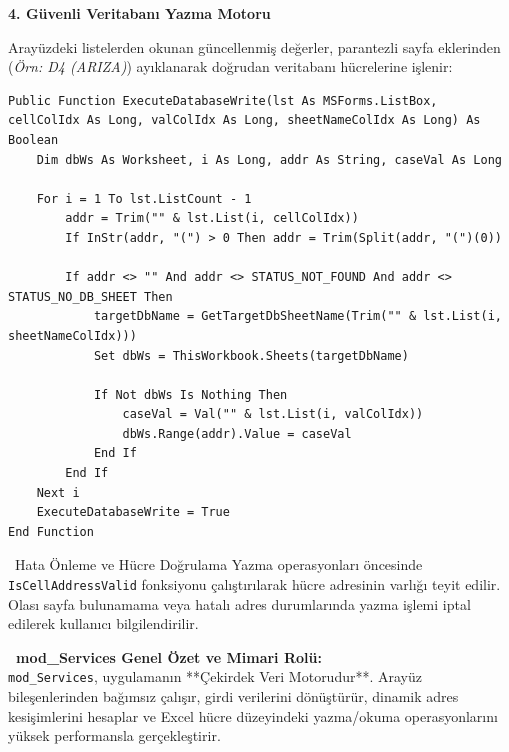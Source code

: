 \vspace{0.3cm}

\textbf{\textcolor{primary}{4. Güvenli Veritabanı Yazma Motoru}}

Arayüzdeki listelerden okunan güncellenmiş değerler, parantezli sayfa eklerinden (\textit{Örn: D4 (ARIZA)}) ayıklanarak doğrudan veritabanı hücrelerine işlenir:

\begin{lstlisting}[caption={Veritabanı Hücre Yazma Operasyonu}]
Public Function ExecuteDatabaseWrite(lst As MSForms.ListBox, cellColIdx As Long, valColIdx As Long, sheetNameColIdx As Long) As Boolean
    Dim dbWs As Worksheet, i As Long, addr As String, caseVal As Long
    
    For i = 1 To lst.ListCount - 1
        addr = Trim("" & lst.List(i, cellColIdx))
        If InStr(addr, "(") > 0 Then addr = Trim(Split(addr, "(")(0))
        
        If addr <> "" And addr <> STATUS_NOT_FOUND And addr <> STATUS_NO_DB_SHEET Then
            targetDbName = GetTargetDbSheetName(Trim("" & lst.List(i, sheetNameColIdx)))
            Set dbWs = ThisWorkbook.Sheets(targetDbName)
            
            If Not dbWs Is Nothing Then
                caseVal = Val("" & lst.List(i, valColIdx))
                dbWs.Range(addr).Value = caseVal
            End If
        End If
    Next i
    ExecuteDatabaseWrite = True
End Function
\end{lstlisting}

\vspace{0.15cm}

\begin{warningbox}{\faExclamationTriangle\ Hata Önleme ve Hücre Doğrulama}
Yazma operasyonları öncesinde \texttt{IsCellAddressValid} fonksiyonu çalıştırılarak hücre adresinin varlığı teyit edilir. Olası sayfa bulunamama veya hatalı adres durumlarında yazma işlemi iptal edilerek kullanıcı bilgilendirilir.
\end{warningbox}

\vspace{0.4cm}

\begin{tcolorbox}[colback=yellow!15,colframe=orange!80!black,leftrule=3.5pt,boxrule=0.4pt,top=5pt,bottom=5pt]
    \textbf{\textcolor{orange!80!black}{\faInfoCircle\ mod\_Services Genel Özet ve Mimari Rolü:}}\\
    \small \texttt{mod\_Services}, uygulamanın **Çekirdek Veri Motorudur**. Arayüz bileşenlerinden bağımsız çalışır, girdi verilerini dönüştürür, dinamik adres kesişimlerini hesaplar ve Excel hücre düzeyindeki yazma/okuma operasyonlarını yüksek performansla gerçekleştirir.
\end{tcolorbox}